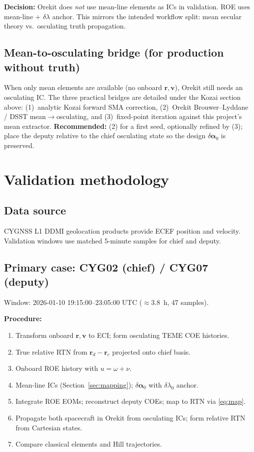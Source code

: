 \documentclass[11pt]{article}
\begin{document}
\textbf{Decision:} Orekit does \emph{not} use mean-line elements as ICs in validation. ROE uses mean-line + $\delta\lambda$ anchor. This mirrors the intended workflow split: mean secular theory vs.\ osculating truth propagation.

\subsection{Mean-to-osculating bridge (for production without truth)}

When only mean elements are available (no onboard $\mathbf{r},\mathbf{v}$), Orekit still needs an osculating IC. The three practical bridges are detailed under the Kozai section above: (1)~analytic Kozai forward SMA correction, (2)~Orekit Brouwer--Lyddane / DSST mean$\to$osculating, and (3)~fixed-point iteration against this project's mean extractor. \textbf{Recommended:} (2) for a first seed, optionally refined by (3); place the deputy relative to the chief osculating state so the design $\delta\bm{\alpha}_0$ is preserved.

\section{Validation methodology}

\subsection{Data source}

CYGNSS L1 DDMI geolocation products provide ECEF position and velocity. Validation windows use matched 5-minute samples for chief and deputy.

\subsection{Primary case: CYG02 (chief) / CYG07 (deputy)}

Window: 2026-01-10 19:15:00--23:05:00 UTC ($\approx 3.8$~h, 47 samples).

\textbf{Procedure:}
\begin{enumerate}
    \item Transform onboard $\mathbf{r},\mathbf{v}$ to ECI; form osculating TEME COE histories.
    \item True relative RTN from $\mathbf{r}_d - \mathbf{r}_c$ projected onto chief basis.
    \item Onboard ROE history with $u = \omega + \nu$.
    \item Mean-line ICs (Section~\ref{sec:mapping}); $\delta\bm{\alpha}_0$ with $\delta\lambda_0$ anchor.
    \item Integrate ROE EOMs; reconstruct deputy COEs; map to RTN via \eqref{eq:map}.
    \item Propagate both spacecraft in Orekit from osculating ICs; form relative RTN from Cartesian states.
    \item Compare classical elements and Hill trajectories.
\end{enumerate}
\end{document}
